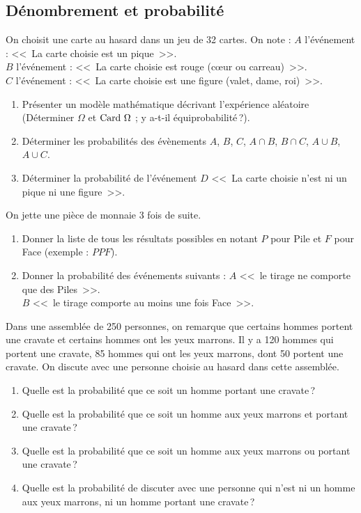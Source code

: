 \subsection*{D\'enombrement et probabilit\'e}
\begin{exo}
On choisit une carte au hasard dans un jeu de 32 cartes. On note : \newline
$A$ l'événement : <<~La carte choisie est un pique~>>.                     \\
$B$ l'événement : <<~La carte choisie est rouge (cœur ou carreau)~>>.      \\
$C$ l'événement : <<~La carte choisie est une figure (valet, dame, roi)~>>.
\begin{enumerate}
\item Présenter un modèle mathématique décrivant l’expérience aléatoire 
      (D\'eterminer $\Omega$ et $\text{Card }\Omega$ ; y a-t-il \'equiprobabilit\'e\,?). \\
\item Déterminer les probabilités des évènements $A$, $B$, $C$, $A\cap B$, $B\cap C$, $A\cup B$, $A\cup C$.
\item Déterminer la probabilité de l'événement $D$ <<~La carte choisie n'est ni un pique ni une figure~>>.
\end{enumerate}
\end{exo}
%
\begin{exo}
On jette une pièce de monnaie 3 fois de suite.
\begin{enumerate}
\item Donner la liste de tous les résultats possibles en notant $P$ pour Pile et $F$ pour Face (exemple : $PPF$).
\item Donner la probabilité des événements suivants : \newline
      $A$ <<~le tirage ne comporte que des Piles~>>.       \\
      $B$ <<~le tirage comporte au moins une fois Face~>>. 
\end{enumerate}
\end{exo}
%
\begin{exo}
Dans une assemblée de 250 personnes, on remarque que certains hommes portent une cravate et certains hommes ont les yeux marrons. Il y a 120 hommes qui portent une cravate, 85 hommes qui ont les yeux marrons, dont 50 portent une cravate.
On discute avec une personne choisie au hasard dans cette assemblée.
\begin{enumerate}
\item Quelle est la probabilité que ce soit un homme portant une cravate\,?
\item Quelle est la probabilité que ce soit un homme aux yeux marrons et portant une cravate\,?
\item Quelle est la probabilité que ce soit un homme aux yeux marrons ou portant une cravate\,?
\item Quelle est la probabilité de discuter avec une personne qui n’est ni un homme aux yeux marrons, ni un homme portant une cravate\,?
\end{enumerate}
\end{exo}
